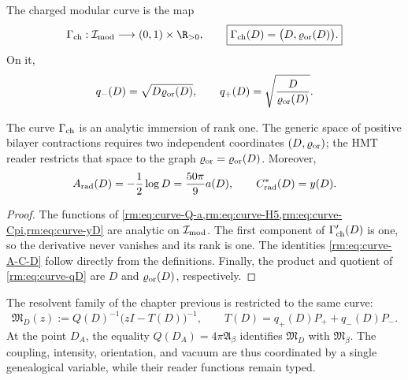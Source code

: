 \begin{definition}
\label{rm:def:charged-modular-curve} The charged modular curve is the map
\begin{equation}
 \Gamma_{\rm ch}:\mathcal I_{\rm mod}\longrightarrow(0,1)\times\R_{>0},
 \qquad
 \boxed{\Gamma_{\rm ch}(D)=\bigl(D,\varrho_{\rm or}(D)\bigr).}
 \label{rm:eq:curve-Gamma}
\end{equation}
On it,
\begin{equation}
 q_-(D)=\sqrt{D\varrho_{\rm or}(D)},
 \qquad
 q_+(D)=\sqrt{\frac{D}{\varrho_{\rm or}(D)}}.
 \label{rm:eq:curve-qD}
\end{equation}
\end{definition}

\begin{theorem}
\label{rm:thm:curve-rank-one}
The curve \(\Gamma_{\rm ch}\) is an analytic immersion of rank one.
The generic space of positive bilayer contractions requires two
independent coordinates \((D,\varrho_{\rm or})\); the HMT reader restricts
that space to the graph \(\varrho_{\rm or}=\varrho_{\rm or}(D)\).
Moreover,
\begin{equation}
 A_{\rm rad}(D)=-\frac12\log D
 =\frac{50\pi}{9}a(D),
 \qquad
 C^*_{\rm rad}(D)=y(D).
 \label{rm:eq:curve-A-C-D}
\end{equation}
\end{theorem}

\begin{proof}
The functions of \cref{rm:eq:curve-Q-a,rm:eq:curve-H5,rm:eq:curve-Cpi,rm:eq:curve-yD}
are analytic on \(\mathcal I_{\rm mod}\). The first component of
\(\Gamma_{\rm ch}'(D)\) is one, so the derivative never vanishes and its rank
is one. The identities \cref{rm:eq:curve-A-C-D} follow directly from the
definitions. Finally, the product and quotient of
\cref{rm:eq:curve-qD} are \(D\) and \(\varrho_{\rm or}(D)\), respectively.
\end{proof}

The resolvent family of the chapter previous is restricted to the same curve:
\begin{equation}
 \mathfrak M_D(z)
 :=Q(D)^{-1}\bigl(zI-T(D)\bigr)^{-1},
 \qquad
 T(D)=q_+(D)P_++q_-(D)P_-.
 \label{rm:eq:curve-resolvent-D}
\end{equation}
At the point \(D_A\), the equality \(Q(D_A)=4\pi\mathfrak A_\beta\)
identifies \(\mathfrak M_D\) with \(\mathfrak M_\beta\). The coupling,
intensity, orientation, and vacuum are thus coordinated by a
single genealogical variable, while their reader functions remain
typed.

